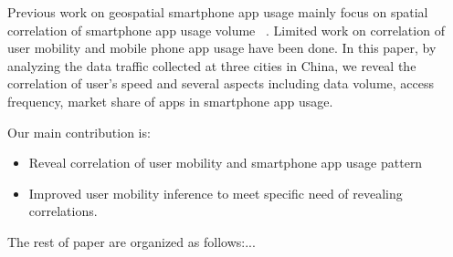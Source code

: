 Previous work on geospatial smartphone app usage mainly focus on spatial correlation of smartphone app usage volume ~\cite{shafiq2012characterizing, yang2015characterizing}. Limited work on correlation of user mobility and mobile phone app usage have been done. In this paper, by analyzing the data traffic collected at three cities in China, we reveal the correlation of user's speed and several aspects including data volume, access frequency, market share of apps in smartphone app usage. 

Our main contribution is:
\begin{itemize}
	\item Reveal correlation of user mobility and smartphone app usage pattern
	\item Improved user mobility inference to meet specific need of revealing correlations.
\end{itemize}

The rest of paper are organized as follows:...

